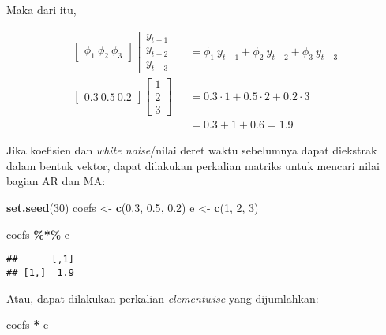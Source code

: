 \documentclass[
]{article}
\newenvironment{Shaded}{\begin{snugshade}}{\end{snugshade}}
\newcommand{\DecValTok}[1]{\textcolor[rgb]{0.00,0.00,0.81}{#1}}
\newcommand{\FloatTok}[1]{\textcolor[rgb]{0.00,0.00,0.81}{#1}}
\newcommand{\FunctionTok}[1]{\textcolor[rgb]{0.13,0.29,0.53}{\textbf{#1}}}
\newcommand{\NormalTok}[1]{#1}
\newcommand{\OtherTok}[1]{\textcolor[rgb]{0.56,0.35,0.01}{#1}}
\newcommand{\SpecialCharTok}[1]{\textcolor[rgb]{0.81,0.36,0.00}{\textbf{#1}}}
\begin{document}
Maka dari itu,

\[
\begin{aligned}
\begin{bmatrix}
\phi_1 \  \phi_2 \ \phi_3
\end{bmatrix}
\begin{bmatrix}
y_{t-1} \\  y_{t-2} \\ y_{t-3}
\end{bmatrix} &= \phi_1 \ y_{t-1}+\phi_2 \ y_{t-2}+\phi_3 \ y_{t-3}
\\
\begin{bmatrix}
 0.3 \ 0.5 \ 0.2
\end{bmatrix}
\begin{bmatrix}
1 \\ 2 \\ 3
\end{bmatrix} & = 0.3 \cdot1+0.5 \cdot 2+0.2 \cdot 3\\
&=0.3+1+0.6 = 1.9
\end{aligned}
\]

Jika koefisien dan \emph{white noise}/nilai deret waktu sebelumnya dapat
diekstrak dalam bentuk vektor, dapat dilakukan perkalian matriks untuk
mencari nilai bagian AR dan MA:

\begin{Shaded}
\begin{Highlighting}[]
\FunctionTok{set.seed}\NormalTok{(}\DecValTok{30}\NormalTok{)}
\NormalTok{coefs }\OtherTok{\textless{}{-}} \FunctionTok{c}\NormalTok{(}\FloatTok{0.3}\NormalTok{, }\FloatTok{0.5}\NormalTok{, }\FloatTok{0.2}\NormalTok{)}
\NormalTok{e }\OtherTok{\textless{}{-}} \FunctionTok{c}\NormalTok{(}\DecValTok{1}\NormalTok{, }\DecValTok{2}\NormalTok{, }\DecValTok{3}\NormalTok{)}

\NormalTok{coefs }\SpecialCharTok{\%*\%}\NormalTok{ e}
\end{Highlighting}
\end{Shaded}

\begin{verbatim}
##      [,1]
## [1,]  1.9
\end{verbatim}

Atau, dapat dilakukan perkalian \emph{elementwise} yang dijumlahkan:

\begin{Shaded}
\begin{Highlighting}[]
\NormalTok{coefs }\SpecialCharTok{*}\NormalTok{ e}
\end{Highlighting}
\end{Shaded}
\end{document}
